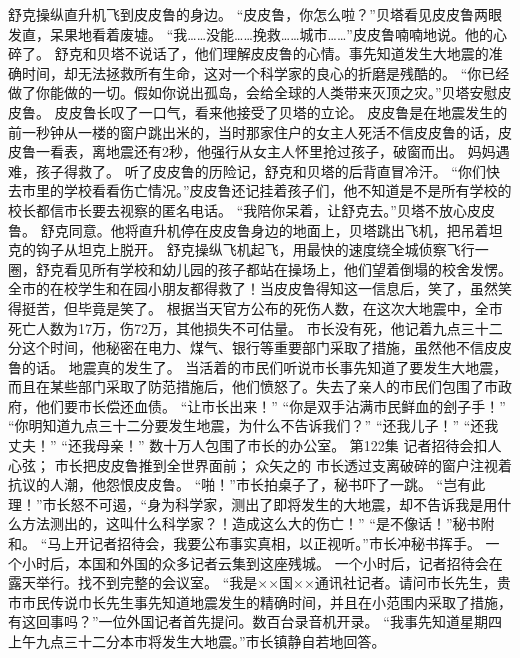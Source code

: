 \documentclass[a4paper,12pt,UTF8,twoside]{ctexbook}
\begin{document}
        舒克操纵直升机飞到皮皮鲁的身边。 
        “皮皮鲁，你怎么啦？”贝塔看见皮皮鲁两眼发直，呆果地看着废墟。 
        “我……没能……挽救……城市……”皮皮鲁喃喃地说。他的心碎了。 
        舒克和贝塔不说话了，他们理解皮皮鲁的心情。事先知道发生大地震的准确时间，却无法拯救所有生命，这对一个科学家的良心的折磨是残酷的。 
        “你已经做了你能做的一切。假如你说出孤岛，会给全球的人类带来灭顶之灾。”贝塔安慰皮皮鲁。 
        皮皮鲁长叹了一口气，看来他接受了贝塔的立论。 
        皮皮鲁是在地震发生的前一秒钟从一楼的窗户跳出米的，当时那家住户的女主人死活不信皮皮鲁的话，皮皮鲁一看表，离地震还有2秒，他强行从女主人怀里抢过孩子，破窗而出。 
        妈妈遇难，孩子得救了。 
        听了皮皮鲁的历险记，舒克和贝塔的后背直冒冷汗。 
        “你们快去市里的学校看看伤亡情况。”皮皮鲁还记挂着孩子们，他不知道是不是所有学校的校长都信市长要去视察的匿名电话。 
        “我陪你呆着，让舒克去。”贝塔不放心皮皮鲁。 
        舒克同意。他将直升机停在皮皮鲁身边的地面上，贝塔跳出飞机，把吊着坦克的钩子从坦克上脱开。 
        舒克操纵飞机起飞，用最快的速度绕全城侦察飞行一圈，舒克看见所有学校和幼儿园的孩子都站在操场上，他们望着倒塌的校舍发愣。 
        全市的在校学生和在园小朋友都得救了！当皮皮鲁得知这一信息后，笑了，虽然笑得挺苦，但毕竟是笑了。 
        根据当天官方公布的死伤人数，在这次大地震中，全市死亡人数为17万，伤72万，其他损失不可估量。 
        市长没有死，他记着九点三十二分这个时间，他秘密在电力、煤气、银行等重要部门采取了措施，虽然他不信皮皮鲁的话。 
        地震真的发生了。 
        当活着的市民们听说市长事先知道了要发生大地震，而且在某些部门采取了防范措施后，他们愤怒了。失去了亲人的市民们包围了市政府，他们要市长偿还血债。 
        “让市长出来！” 
        “你是双手沾满市民鲜血的刽子手！” 
        “你明知道九点三十二分要发生地震，为什么不告诉我们？” 
        “还我儿子！” 
        “还我丈夫！” 
        “还我母亲！” 
        数十万人包围了市长的办公室。   第122集 
        记者招待会扣人心弦； 
        市长把皮皮鲁推到全世界面前； 
        众矢之的   
        市长透过支离破碎的窗户注视着抗议的人潮，他怨恨皮皮鲁。 
        “啪！”市长拍桌子了，秘书吓了一跳。 
        “岂有此理！”市长怒不可遏，“身为科学家，测出了即将发生的大地震，却不告诉我是用什么方法测出的，这叫什么科学家？！造成这么大的伤亡！” 
        “是不像话！”秘书附和。 
        “马上开记者招待会，我要公布事实真相，以正视听。”市长冲秘书挥手。 
        一个小时后，本国和外国的众多记者云集到这座残城。 
        一个小时后，记者招待会在露天举行。找不到完整的会议室。 
        “我是××国××通讯社记者。请问市长先生，贵市市民传说巾长先生事先知道地震发生的精确时间，并且在小范围内采取了措施，有这回事吗？”一位外国记者首先提问。数百台录音机开录。 
        “我事先知道星期四上午九点三十二分本市将发生大地震。”市长镇静自若地回答。 
\end{document}
